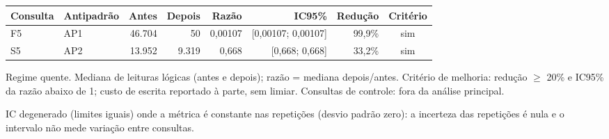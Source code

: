 {\small\setlength{\tabcolsep}{4pt}
\begin{tabular}{llrrrrrc}
\toprule
Consulta & Antipadrão & Antes & Depois & Razão & IC95\% & Redução & Critério \\
\midrule
F5 & AP1 & 46.704 & 50 & 0,00107 & [0,00107; 0,00107] & 99,9\% & sim \\
S5 & AP2 & 13.952 & 9.319 & 0,668 & [0,668; 0,668] & 33,2\% & sim \\
\bottomrule
\end{tabular}\par
\vspace{3pt}
\begin{minipage}{\linewidth}\footnotesize
Regime quente. Mediana de leituras lógicas (antes e depois); razão = mediana depois/antes. Critério de melhoria: redução $\geq$ 20\% e IC95\% da razão abaixo de 1; custo de escrita reportado à parte, sem limiar. Consultas de controle: fora da análise principal.\par
IC degenerado (limites iguais) onde a métrica é constante nas repetições (desvio padrão zero): a incerteza das repetições é nula e o intervalo não mede variação entre consultas.
\end{minipage}
}
